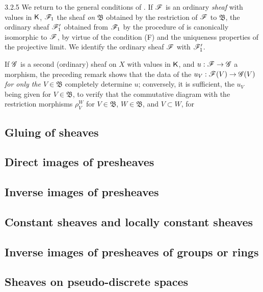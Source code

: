 \documentclass[10pt,oneside]{book}
\begin{document}
\begin{env}{3.2.5}
\label{env-0.3.2.5}
We return to the general conditions of . If $\mathscr{F}$ is an ordinary
\emph{sheaf} with values in $\mathsf{K}$, $\mathscr{F}_1$ the sheaf \emph{on} $\mathfrak{B}$ obtained
by the restriction of $\mathscr{F}$ to $\mathfrak{B}$, the ordinary sheaf $\mathscr{F}_1'$ obtained
from $\mathscr{F}_1$ by the procedure of  is canonically isomorphic to $\mathscr{F}$,
by virtue of the condition (F) and the uniqueness properties of the projective limit. We
identify the ordinary sheaf $\mathscr{F}$ with $\mathscr{F}_1'$.

If $\mathscr{G}$ is a second (ordinary) sheaf on $X$ with values in $\mathsf{K}$, and $u:\mathscr{F}\to\mathscr{G}$
a morphism, the preceding remark shows that the data of the $u_V:\mathscr{F}(V)\to\mathscr{G}(V)$
\emph{for only the $V\in\mathfrak{B}$} completely determine $u$; conversely, it is
sufficient, the $u_V$ being given for $V\in\mathfrak{B}$, to verify that the commutative
diagram with the restriction morphisms $\rho_V^W$ for $V\in\mathfrak{B}$, $W\in\mathfrak{B}$,
and $V\subset W$, for
\end{env}

\subsection{Gluing of sheaves}
\label{0-prelim-3.3}

\subsection{Direct images of presheaves}
\label{0-prelim-3.4}

\subsection{Inverse images of presheaves}
\label{0-prelim-3.5}

\subsection{Constant sheaves and locally constant sheaves}
\label{0-prelim-3.6}

\subsection{Inverse images of presheaves of groups or rings}
\label{0-prelim-3.7}

\subsection{Sheaves on pseudo-discrete spaces}
\label{0-prelim-3.8}
\end{document}
